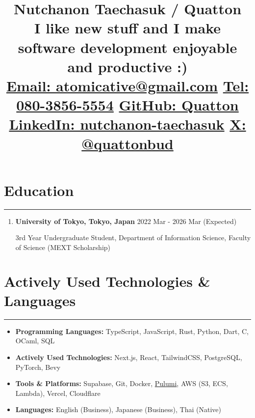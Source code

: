 \documentclass[
  a4paper,
  10pt,
  dvipdfmx
]{article}
\begin{document}
\newcommand{\cvsection}[1]{
  \section*{#1}
  \hrule
  \bigskip
}

\title{
  \vspace{-2cm}Nutchanon Taechasuk / Quatton \\
  \vspace{0.25cm}
  \large{I like new stuff and I make software development enjoyable and productive :)} \\
  \vspace{0.25cm}
  \small{
    \href{mailto:atomicative@gmail.com}{Email: atomicative@gmail.com}
    \hfill
    \href{tel:+8180-3856-5554}{Tel: 080-3856-5554}
    \hfill
    \href{http://github.com/Quatton}{GitHub: Quatton}
    \hfill
    \href{http://linkedin.com/in/nutchanon-taechasuk/}{LinkedIn: nutchanon-taechasuk}
    \hfill
    \href{http://x.com/quattonbud}{X: @quattonbud}
  }
  \vspace{-1.5cm}

}
\date{}
\maketitle
{}

\cvsection{Education}
\begin{enumerate}[]
  \item \textbf{University of Tokyo, Tokyo, Japan} \hfill 2022 Mar - 2026 Mar (Expected)

        3rd Year Undergraduate Student, Department of Information Science, Faculty of Science (MEXT Scholarship)
\end{enumerate}


\cvsection{Actively Used Technologies \& Languages}

\begin{itemize}
  \itemsep0em
  \item \textbf{Programming Languages:} TypeScript, JavaScript, Rust, Python, Dart, C, OCaml, SQL
  \item \textbf{Actively Used Technologies:} Next.js, React, TailwindCSS, PostgreSQL, PyTorch, Bevy
  \item \textbf{Tools \& Platforms:} Supabase, Git, Docker,
        \href{https://pulumi.com}{Pulumi}, AWS (S3, ECS, Lambda), Vercel, Cloudflare
  \item \textbf{Languages:} English (Business), Japanese (Business), Thai (Native)
\end{itemize}
\end{document}
